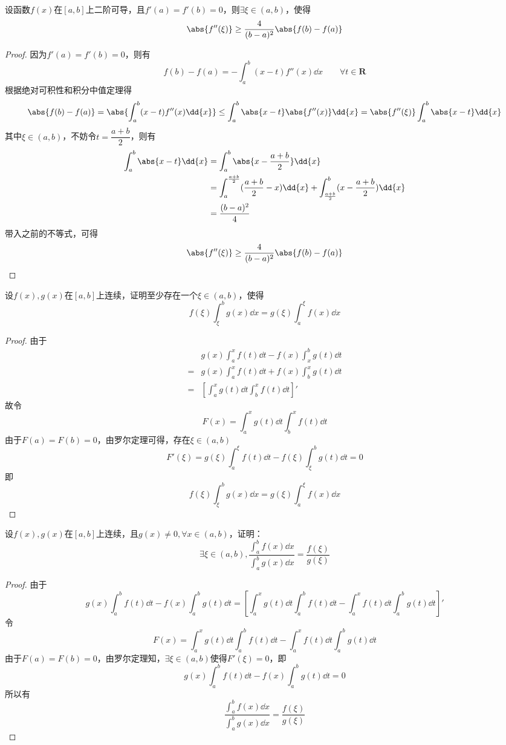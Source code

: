 \begin{example}
    设函数$f(x)$在$[a,b]$上二阶可导，且$f'(a)=f'(b)=0$，则$\exists\xi\in(a,b)$，使得
    \[ \abs{f''(\xi)} \geq \frac{4}{(b-a)^2}\abs{f(b)-f(a)} \]
\end{example}
\begin{proof}
    因为$f'(a)=f'(b)=0$，则有
    \[ f(b)-f(a) = -\int_a^b(x-t)f''(x)\dd{x} \qquad \forall t \in \mathbf{R}\]
    根据绝对可积性和积分中值定理得
    \[
        \abs{f(b)-f(a)}  = \abs{\int_a^b(x-t)f''(x)\dd{x}} \leq \int_a^b\abs{x-t}\abs{f''(x)}\dd{x} = \abs{f''(\xi)}\int_a^b\abs{x-t}\dd{x}
    \]
    其中$\xi\in(a,b)$，不妨令$t=\dfrac{a+b}{2}$，则有
    \begin{align*}
        \int_a^b\abs{x-t}\dd{x}
         & = \int_a^b \abs{x-\frac{a+b}{2}}\dd{x}                                                          \\
         & = \int_a^{\frac{a+b}{2}}(\frac{a+b}{2}-x)\dd{x} + \int_{\frac{a+b}{2}}^b(x-\frac{a+b}{2})\dd{x} \\
         & = \frac{(b-a)^2}{4}
    \end{align*}
    带入之前的不等式，可得
    \[ \abs{f''(\xi)} \geq \frac{4}{(b-a)^2}\abs{f(b)-f(a)} \]
\end{proof}

\begin{example}
    设$f(x),g(x)$在$[a,b]$上连续，证明至少存在一个$\xi\in(a,b)$，使得
    \[ f(\xi)\int_\xi^b g(x)\dd{x} = g(\xi)\int_a^\xi f(x)\dd{x} \]
\end{example}
\begin{proof}
    由于
    \begin{align*}
          & g(x)\int_a^x f(t)\dd{t} - f(x)\int_x^b g(t)\dd{t}   \\
        = & g(x)\int_a^x f(t)\dd{t} + f(x)\int_b^x g(t)\dd{t}   \\
        = & \left[\int_a^xg(t)\dd{t} \int_b^xf(t)\dd{t}\right]'
    \end{align*}
    故令
    \[ F(x) = \int_a^xg(t)\dd{t} \int_b^xf(t)\dd{t} \]
    由于$F(a)=F(b)=0$，由罗尔定理可得，存在$\xi\in(a,b)$
    \[ F'(\xi) = g(\xi)\int_a^\xi f(t)\dd{t} - f(\xi)\int_\xi^b g(t)\dd{t} = 0 \]
    即
    \[ f(\xi)\int_\xi^b g(x)\dd{x} = g(\xi)\int_a^\xi f(x)\dd{x} \]
\end{proof}

\begin{example}
    设$f(x),g(x)$在$[a,b]$上连续，且$g(x)\neq 0,\forall x\in(a,b)$，证明：
    \[ \exists \xi\in(a,b) , \frac{\int_a^bf(x)\dd{x}}{\int_a^bg(x)\dd{x}} = \frac{f(\xi)}{g(\xi)} \]
\end{example}
\begin{proof}
    由于
    \[
        g(x)\int_a^bf(t)\dd{t} - f(x)\int_a^bg(t)\dd{t}
        =
        \left[ \int_a^xg(t)\dd{t} \int_a^bf(t)\dd{t} - \int_a^xf(t)\dd{t} \int_a^bg(t)\dd{t} \right]'
    \]
    令
    \[ F(x) = \int_a^xg(t)\dd{t} \int_a^bf(t)\dd{t} - \int_a^xf(t)\dd{t} \int_a^bg(t)\dd{t} \]
    由于$F(a)=F(b)=0$，由罗尔定理知，$\exists\xi\in(a,b)$使得$F'(\xi)=0$，即
    \[ g(x)\int_a^bf(t)\dd{t} - f(x)\int_a^bg(t)\dd{t} = 0 \]
    所以有
    \[ \frac{\int_a^bf(x)\dd{x}}{\int_a^bg(x)\dd{x}} = \frac{f(\xi)}{g(\xi)} \]
\end{proof}

